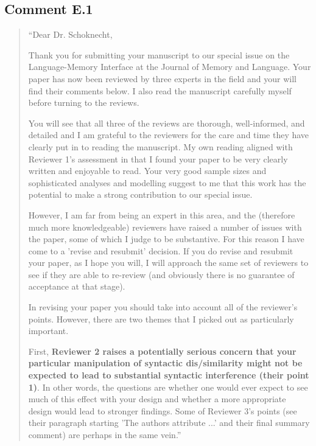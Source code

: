 \documentclass[12pt]{article}
\begin{document}
\subsection*{Comment E.1}
\begin{quote}
``Dear Dr. Schoknecht,

Thank you for submitting your manuscript to our special issue on the Language-Memory Interface at the Journal of Memory and Language. Your paper has now been reviewed by three experts in the field and your will find their comments below. I also read the manuscript carefully myself before turning to the reviews.

You will see that all three of the reviews are thorough, well-informed, and detailed and I am grateful to the reviewers for the care and time they have clearly put in to reading the manuscript. My own reading aligned with Reviewer 1's assessment in that I found your paper to be very clearly written and enjoyable to read. Your very good sample sizes and sophisticated analyses and modelling suggest to me that this work has the potential to make a strong contribution to our special issue.

However, I am far from being an expert in this area, and the (therefore much more knowledgeable) reviewers have raised a number of issues with the paper, some of which I judge to be substantive. For this reason I have come to a 'revise and resubmit' decision. If you do revise and resubmit your paper, as I hope you will, I will approach the same set of reviewers to see if they are able to re-review (and obviously there is no guarantee of acceptance at that stage).

In revising your paper you should take into account all of the reviewer's points. However, there are two themes that I picked out as particularly important.

First, \textbf{Reviewer 2 raises a potentially serious concern that your particular manipulation of syntactic dis/similarity might not be expected to lead to substantial syntactic interference (their point 1)}. In other words, the questions are whether one would ever expect to see much of this effect with your design and whether a more appropriate design would lead to stronger findings. Some of Reviewer 3's points (see their paragraph starting 'The authors attribute ...' and their final summary comment) are perhaps in the same vein.''
\end{quote}
\end{document}
